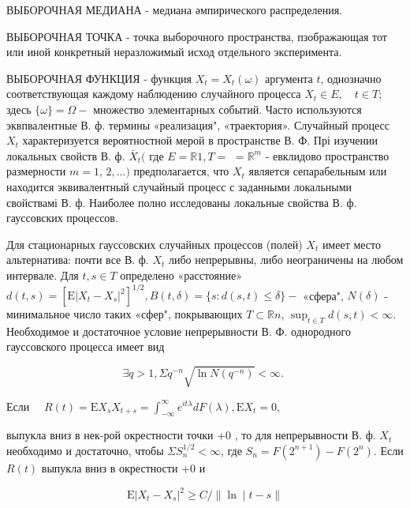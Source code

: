 \documentclass[10pt]{article}
\begin{document}
ВЫБОРОЧНАЯ МЕДИАНА - медиана әмпирического распределения.



ВЫБОРОЧНАЯ ТОЧКА - точка выборочного пространства, пзображающая тот или иной конкретный неразложимый исход отдельного эксперимента.



ВЫБОРОЧНАЯ ФУНКЦИЯ - функция $X_{t}=X_{t}(\omega)$ аргумента $t$, однозначно соответствующая каждому наблюдению случайного процесса $X_{t} \in E, \quad t \in T ;$ здесь $\{\omega\}=\Omega-$ множество элементарных событий. Часто используются эквпвалентные В. ф. термины «реализация", «траектория». Случайный процесс $X_{t}$ характеризуется вероятностной мерой в пространстве В. Ф. Прі изучении локальных свойств В. ф. $\bar{X}_{t}($ где $E=\mathbb{R} 1, T=$ $=\mathbb{R}^{m}$ - евклидово пространство размерности $m=1$, $2, \ldots)$ предполагается, что $X_{t}$ является сепарабельным или находится эквивалентный случайный процесс с заданными локальными свойствамі В. ф. Наиболее полно исследованы локальные свойства В. ф. гауссовских процессов.



Для стационарных гауссовских случайных процессов (полей) $X_{t}$ имеет место альтернатива: почти все В. ф. $X_{t}$ либо непрерывны, либо неограничены на любом интервале. Для $t, s \in T$ определено «расстояние» $d(t, s)=\left[\mathrm{E}\left|X_{t}-X_{s}\right|^{2}\right]^{1 / 2}, B(t, \delta)=\{s: d(s, t) \leqslant \delta\}-$ «сфера", $N(\delta)$ - минимальное число таких «сфер", покрывающих $T \subset \mathbb{R} n$, $\sup _{t \in T} d(s, t)<\infty$. Необходимое и достаточное условие непрерывности В. Ф. однородного гауссовского процесса имеет вид



\[

\exists q>1, \Sigma q^{-n} \sqrt{\ln N\left(q^{-n}\right)}<\infty \text {. }

\]



Если $\quad R(t)=\mathrm{E} X_{s} X_{t+s}=\int_{-\infty}^{\infty} e^{i t \lambda} d F(\lambda), \mathrm{E} X_{t}=0$,



выпукла вниз в нек-рой окрестности точки +0 , то для непрерывности В. ф. $X_{t}$ необходимо и достаточно, чтобы $\Sigma S_{n}^{1 / 2}<\infty$, где $S_{n}=F\left(2^{n+1}\right)-F\left(2^{n}\right)$. Если $R(t)$ выпукла вниз в окрестности +0 и



\[

\mathrm{E}\left|X_{t}-X_{s}\right|^{2} \geqslant C /\|\ln \mid t-s\|

\]
\end{document}
